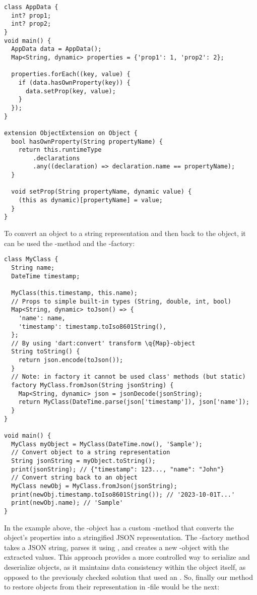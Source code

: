 \begin{lstlisting}
class AppData {
  int? prop1;
  int? prop2;
}
void main() {
  AppData data = AppData();
  Map<String, dynamic> properties = {'prop1': 1, 'prop2': 2};

  properties.forEach((key, value) {
    if (data.hasOwnProperty(key)) {
      data.setProp(key, value);
    }
  });
}

extension ObjectExtension on Object {
  bool hasOwnProperty(String propertyName) {
    return this.runtimeType
        .declarations
        .any((declaration) => declaration.name == propertyName);
  }

  void setProp(String propertyName, dynamic value) {
    (this as dynamic)[propertyName] = value;
  }
}
\end{lstlisting}

\noindent To convert an object to a string representation and then back to the object, it can be used the 
-method and the -factory: 

\begin{lstlisting}
class MyClass {
  String name;
  DateTime timestamp;

  MyClass(this.timestamp, this.name);
  // Props to simple built-in types (String, double, int, bool)
  Map<String, dynamic> toJson() => {
    'name': name,
    'timestamp': timestamp.toIso8601String(),
  };
  // By using 'dart:convert' transform \q{Map}-object
  String toString() {
    return json.encode(toJson());
  }
  // Note: in factory it cannot be used class' methods (but static)
  factory MyClass.fromJson(String jsonString) {
    Map<String, dynamic> json = jsonDecode(jsonString);
    return MyClass(DateTime.parse(json['timestamp']), json['name']);
  }
}

void main() {
  MyClass myObject = MyClass(DateTime.now(), 'Sample');
  // Convert object to a string representation
  String jsonString = myObject.toString();
  print(jsonString); // {"timestamp": 123..., "name": "John"}
  // Convert string back to an object
  MyClass newObj = MyClass.fromJson(jsonString);
  print(newObj.timestamp.toIso8601String()); // '2023-10-01T...'
  print(newObj.name); // 'Sample'
}
\end{lstlisting}

\noindent In the example above, the -object has a custom -method that converts the object's 
properties into a stringified JSON representation. The -factory method takes a JSON string, parses it using 
, and creates a new -object with the extracted values. This approach provides a more 
controlled way to serialize and deserialize objects, as it maintains data consistency within the object itself,
as opposed to the previously checked solution that used an . So, finally our method to restore objects 
from their representation in -file would be the next:

